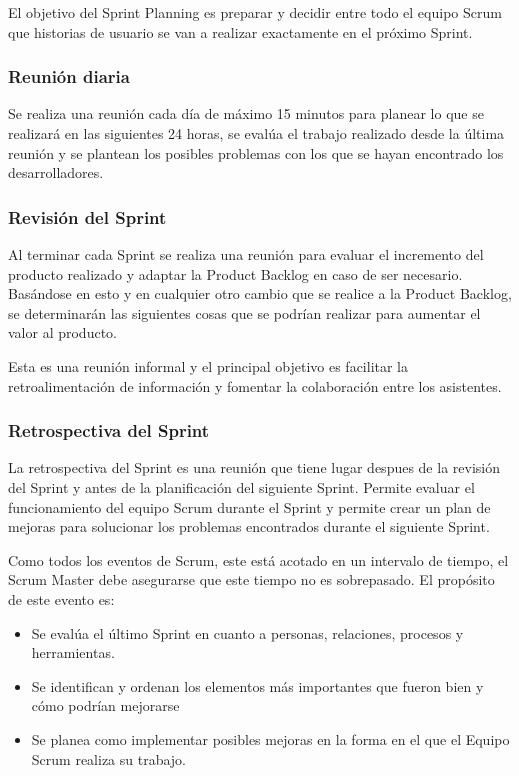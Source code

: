 El objetivo del Sprint Planning es preparar y decidir entre todo el equipo Scrum que historias
de usuario se van a realizar exactamente en el próximo Sprint.

\subsubsection{Reunión diaria}

Se realiza una reunión cada día de máximo 15 minutos para planear lo que se realizará en las 
siguientes 24 horas, se evalúa el trabajo realizado desde la última reunión y se plantean los 
posibles problemas con los que se hayan encontrado los desarrolladores.

\subsubsection{Revisión del Sprint}

Al terminar cada Sprint se realiza una reunión para evaluar el incremento del producto realizado y 
adaptar la Product Backlog en caso de ser necesario. Basándose en esto y en cualquier otro cambio
que se realice a la Product Backlog, se determinarán las siguientes cosas que se podrían realizar 
para aumentar el valor al producto.

Esta es una reunión informal y el principal objetivo es facilitar la retroalimentación de información y 
fomentar la colaboración entre los asistentes.

\subsubsection{Retrospectiva del Sprint}

La retrospectiva del Sprint es una reunión que tiene lugar despues de la revisión del Sprint y antes 
de la planificación del siguiente Sprint. Permite evaluar el funcionamiento del equipo Scrum durante 
el Sprint y permite crear un plan de mejoras para solucionar los problemas encontrados durante el 
siguiente Sprint. 

Como todos los eventos de Scrum, este está acotado en un intervalo de tiempo, el Scrum Master 
debe asegurarse que este tiempo no es sobrepasado. El propósito de este evento es: 

\begin{itemize}
	\item Se evalúa el último Sprint en cuanto a personas, relaciones, procesos y herramientas.
	\item Se identifican y ordenan los elementos más importantes que fueron bien y cómo podrían 
	mejorarse
	\item Se planea como implementar posibles mejoras en la forma en el que el Equipo Scrum realiza
	su trabajo.
\end{itemize}

